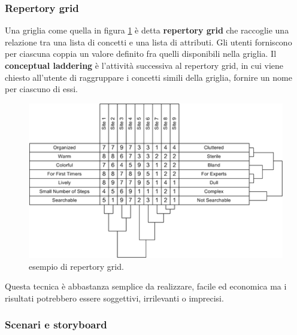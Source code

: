\subsubsection{Repertory grid} Una griglia come quella in figura \ref{fig:repertorygrid} è detta \textbf{repertory grid} che raccoglie una relazione tra una lista di concetti e una lista di attributi. Gli utenti forniscono per ciascuna coppia un valore definito fra quelli disponibili nella griglia. Il \textbf{conceptual laddering} è l'attività successiva al repertory grid, in cui viene chiesto all'utente di raggruppare i concetti simili della griglia, fornire un nome per ciascuno di essi.
\begin{figure}[th]
	\centering
	\includegraphics[width=0.7\linewidth]{img/repertory_grid}
	\caption{esempio di repertory grid.}
	\label{fig:repertorygrid}
\end{figure}
Questa tecnica è abbastanza semplice da realizzare, facile ed economica ma i risultati potrebbero essere soggettivi, irrilevanti o imprecisi.
\subsubsection{Scenari e storyboard}

